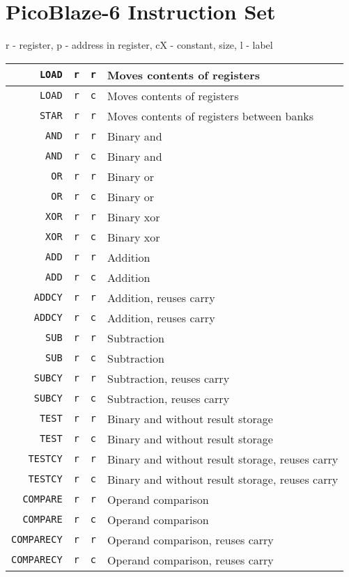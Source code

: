 \chapter{PicoBlaze-6 Instruction Set}
\begin{table}[H]
\centering
r - register, p - address in register, cX - constant, size, l - label
\begin{tabular}{| r | c | c | l |}\hline

\verb|LOAD|&\verb|r|&\verb|r|& Moves contents of registers\\ \hline
\verb|LOAD|&\verb|r|&\verb|c|& Moves contents of registers\\ \hline
\verb|STAR|&\verb|r|&\verb|r|& Moves contents of registers between banks\\ \hline

\verb|AND|&\verb|r|&\verb|r|& Binary and\\ \hline
\verb|AND|&\verb|r|&\verb|c|& Binary and\\ \hline
\verb|OR|&\verb|r|&\verb|r|& Binary or\\ \hline
\verb|OR|&\verb|r|&\verb|c|& Binary or\\ \hline
\verb|XOR|&\verb|r|&\verb|r|& Binary xor\\ \hline
\verb|XOR|&\verb|r|&\verb|c|& Binary xor\\ \hline

\verb|ADD|&\verb|r|&\verb|r|& Addition\\ \hline
\verb|ADD|&\verb|r|&\verb|c|& Addition\\ \hline
\verb|ADDCY|&\verb|r|&\verb|r|& Addition, reuses carry\\ \hline
\verb|ADDCY|&\verb|r|&\verb|c|& Addition, reuses carry\\ \hline
\verb|SUB|&\verb|r|&\verb|r|& Subtraction\\ \hline
\verb|SUB|&\verb|r|&\verb|c|& Subtraction\\ \hline
\verb|SUBCY|&\verb|r|&\verb|r|& Subtraction, reuses carry\\ \hline
\verb|SUBCY|&\verb|r|&\verb|c|& Subtraction, reuses carry\\ \hline


\verb|TEST|&\verb|r|&\verb|r|& Binary and without result storage\\ \hline
\verb|TEST|&\verb|r|&\verb|c|& Binary and without result storage\\ \hline
\verb|TESTCY|&\verb|r|&\verb|r|& Binary and without result storage, reuses carry\\ \hline
\verb|TESTCY|&\verb|r|&\verb|c|& Binary and without result storage, reuses carry\\ \hline
\verb|COMPARE|&\verb|r|&\verb|r|& Operand comparison\\ \hline
\verb|COMPARE|&\verb|r|&\verb|c|& Operand comparison\\ \hline
\verb|COMPARECY|&\verb|r|&\verb|r|& Operand comparison, reuses carry\\ \hline
\verb|COMPARECY|&\verb|r|&\verb|c|& Operand comparison, reuses carry\\ \hline


\end{tabular}
\end{table}
